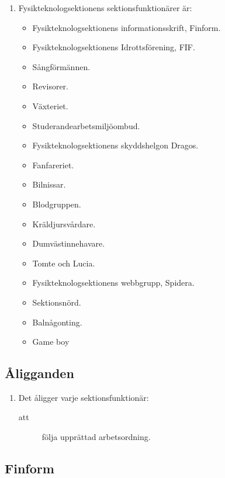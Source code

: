 \documentclass[11pt,a4paper]{article}
\begin{document}
\begin{enumerate}[\thesubsection .1]

  \item Fysikteknologsektionens sektionsfunktionärer är:
    \begin{itemize}
      \item Fysikteknologsektionens informationsskrift, Finform.
      \item Fysikteknologsektionens Idrottsförening, FIF.
      \item Sångförmännen.
      \item Revisorer.
      \item Växteriet.
      \item Studerandearbetsmiljöombud.
      \item Fysikteknologsektionens skyddshelgon Dragos.
      \item Fanfareriet.
      \item Bilnissar.
      \item Blodgruppen.
      \item Kräldjursvårdare.
      \item Dumvästinnehavare.
      \item Tomte och Lucia.
      \item Fysikteknologsektionens webbgrupp, Spidera.
      \item Sektionsnörd.
      \item Balnågonting.
      \item Game boy
    \end{itemize}

\end{enumerate}

\subsection{Åligganden}

\begin{enumerate}[\thesubsection .1]

  \item Det åligger varje sektionsfunktionär:
    \begin{description}
    \item[att] följa upprättad arbetsordning.
  
    \end{description}

\end{enumerate}

\subsection{Finform}
\end{document}
